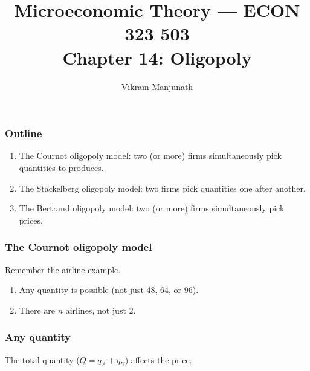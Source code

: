 \documentclass[xcolor=pdftex,dvipsnames]{beamer}
\title{Microeconomic Theory --- ECON 323 503 \\ Chapter 14: Oligopoly
 \rsout{and Monopolistic Competitions}}
\author{Vikram Manjunath}       %
\institute{Texas A\&M University}
\begin{document}
\maketitle

\begin{frame}
\frametitle{Outline}
\begin{enumerate}[<+->]
\item The Cournot oligopoly model: two (or more) firms simultaneously
  pick quantities to produces.
\item The Stackelberg oligopoly model: two firms pick quantities one after another.
\item The Bertrand oligopoly model: two (or more) firms simultaneously
  pick prices.
\end{enumerate}
\end{frame}


\begin{frame}
  \frametitle{The Cournot oligopoly model}
  Remember the airline example.
  \bigskip
  
  \begin{enumerate}
  \item<3-> Any quantity is possible (not just 48, 64, or 96).
  \item<4-> There are $n$ airlines, not just 2.
  \end{enumerate}

\end{frame}

\begin{frame}
  \frametitle{Any quantity}
  The total quantity ($Q = q_A  + q_U$) affects the price.
\bigskip


\bigskip


\end{frame}
\end{document}
